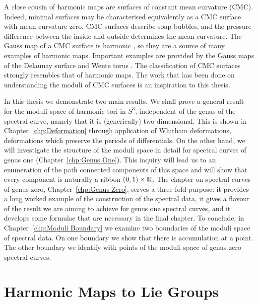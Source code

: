 A close cousin of harmonic maps are surfaces of constant mean curvature (CMC). Indeed, minimal surfaces may be characterised equivalently as a CMC surface with mean curvature zero. CMC surfaces describe soap bubbles, and the pressure difference between the inside and outside determines the mean curvature. The Gauss map of a CMC surface is harmonic \cite{Ruh1970}, so they are a source of many examples of harmonic maps. Important examples are provided by the Gauss maps of the Delaunay surface \cite{Delaunay1841} and Wente torus \cite{Wente1986}. The classification of CMC surfaces \cite{Sterling1989,Bobenko1991} strongly resembles that of harmonic maps. The work that has been done on understanding the moduli of CMC surfaces \cite{Kilian2008,Kilian2015a,Carberry2016} is an inspiration to this thesis.

In this thesis we demonstrate two main results. We shall prove a general result for the moduli space of harmonic tori in $S^3$, independent of the genus of the spectral curve, namely that it is (generically) two-dimensional. This is shown in Chapter~\ref{chp:Deformation} through application of Whitham deformations, deformations which preserve the periods of differentials. On the other hand, we will investigate the structure of the moduli space in detail for spectral curves of genus one (Chapter~\ref{chp:Genus One}). This inquiry will lead us to an enumeration of the path connected components of this space and will show that every component is naturally a ribbon $(0,1)\times \R$. The chapter on spectral curves of genus zero, Chapter~\ref{chp:Genus Zero}, serves a three-fold purpose: it provides a long worked example of the construction of the spectral data, it gives a flavour of the result we are aiming to achieve for genus one spectral curves, and it develops some formulae that are necessary in the final chapter. To conclude, in Chapter~\ref{chp:Moduli Boundary} we examine two boundaries of the moduli space of spectral data. On one boundary we show that there is accumulation at a point. The other boundary we identify with points of the moduli space of genus zero spectral curves.



















\section{Harmonic Maps to Lie Groups}

